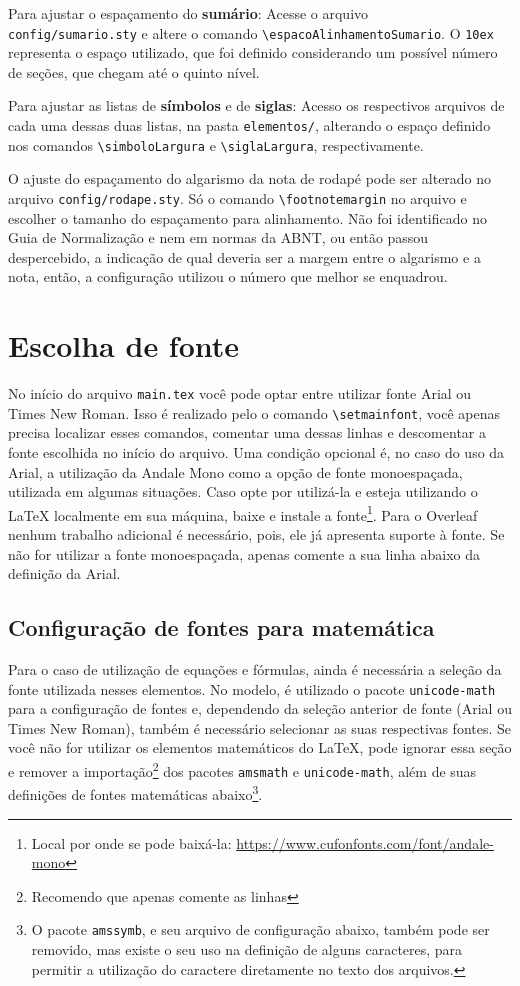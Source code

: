 Para ajustar o espaçamento do \textbf{sumário}: Acesse o arquivo \\\texttt{config/sumario.sty} e altere o comando \verb|\espacoAlinhamentoSumario|. O \texttt{10ex} representa o espaço utilizado, que foi definido considerando um possível número de seções, que chegam até o quinto nível.

Para ajustar as listas de \textbf{símbolos} e de \textbf{siglas}: Acesso os respectivos arquivos de cada uma dessas duas listas, na pasta \texttt{elementos/}, alterando o espaço definido nos comandos \verb|\simboloLargura| e \verb|\siglaLargura|, respectivamente.

O ajuste do espaçamento do algarismo da nota de rodapé pode ser alterado no arquivo \texttt{config/rodape.sty}. Só o comando \verb|\footnotemargin| no arquivo e escolher o tamanho do espaçamento para alinhamento. Não foi identificado no Guia de Normalização e nem em normas da ABNT, ou então passou despercebido, a indicação de qual deveria ser a margem entre o algarismo e a nota, então, a configuração utilizou o número que melhor se enquadrou.

\section{Escolha de fonte}
No início do arquivo \texttt{main.tex} você pode optar entre utilizar fonte Arial ou Times New Roman. Isso é realizado pelo o comando \verb|\setmainfont|, você apenas precisa localizar esses comandos, comentar uma dessas linhas e descomentar a fonte escolhida no início do arquivo. Uma condição opcional é, no caso do uso da Arial, a utilização da Andale Mono como a opção de fonte monoespaçada, utilizada em algumas situações. Caso opte por utilizá-la e esteja utilizando o \LaTeX{} localmente em sua máquina, baixe e instale a fonte\footnote{Local por onde se pode baixá-la: \url{https://www.cufonfonts.com/font/andale-mono}}. Para o Overleaf nenhum trabalho adicional é necessário, pois, ele já apresenta suporte à fonte. Se não for utilizar a fonte monoespaçada, apenas comente a sua linha abaixo da definição da Arial.

\subsection{Configuração de fontes para matemática}
Para o caso de utilização de equações e fórmulas, ainda é necessária a seleção da fonte utilizada nesses elementos. No modelo, é utilizado o pacote \texttt{unicode-math} para a configuração de fontes e, dependendo da seleção anterior de fonte (Arial ou Times New Roman), também é necessário selecionar as suas respectivas fontes. Se você não for utilizar os elementos matemáticos do \LaTeX, pode ignorar essa seção e remover a importação\footnote{Recomendo que apenas comente as linhas} dos pacotes \texttt{amsmath} e \texttt{unicode-math}, além de suas definições de fontes matemáticas abaixo\footnote{O pacote \texttt{amssymb}, e seu arquivo de configuração abaixo, também pode ser removido, mas existe o seu uso na definição de alguns caracteres, para permitir a utilização do caractere diretamente no texto dos arquivos.}.

